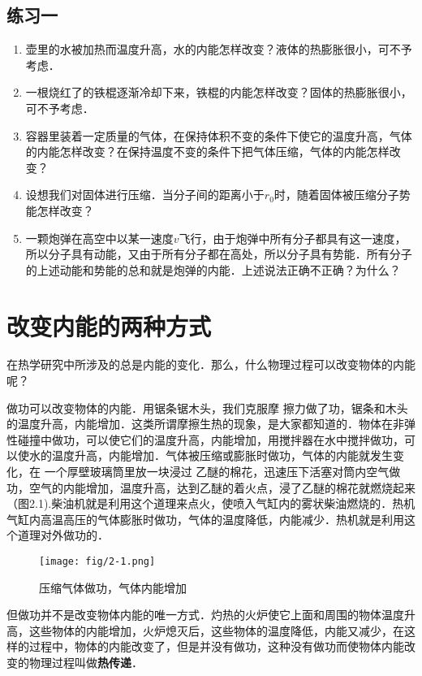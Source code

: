 \subsection*{练习一}
\begin{enumerate}
	\item 壶里的水被加热而温度升高，水的内能怎样改变？液体的热膨胀很小，可不予考虑．
\item 一根烧红了的铁棍逐渐冷却下来，铁棍的内能怎样改变？固体的热膨胀很小，可不予考虑．
\item 容器里装着一定质量的气体，在保持体积不变的条件下使它的温度升高，气体的内能怎样改变？在保持温度不变的条件下把气体压缩，气体的内能怎样改变？
\item 设想我们对固体进行压缩．当分子间的距离小于$r_0$时，随着固体被压缩分子势能怎样改变？
\item 一颗炮弹在高空中以某一速度$v$飞行，由于炮弹中所有分子都具有这一速度，所以分子具有动能，又由于所有分子都在高处，所以分子具有势能．所有分子的上述动能和势能的总和就是炮弹的内能．上述说法正确不正确？为什么？
\end{enumerate}

\section{改变内能的两种方式}
在热学研究中所涉及的总是内能的变化．那么，什么物理过程可以改变物体的内能呢？

做功可以改变物体的内能．用锯条锯木头，我们克服摩
擦力做了功，锯条和木头的温度升高，内能增加．这类所谓摩擦生热的现象，是大家都知道的．物体在非弹性碰撞中做功，可以使它们的温度升高，内能增加，用搅拌器在水中搅拌做功，可以使水的温度升高，内能增加．气体被压缩或膨胀时做功，气体的内能就发生变化，在
一个厚壁玻璃筒里放一块浸过
乙醚的棉花，迅速压下活塞对筒内空气做功，空气的内能增加，温度升高，达到乙醚的着火点，浸了乙醚的棉花就燃烧起来（图2.1).柴油机就是利用这个道理来点火，使喷入气缸内的雾状柴油燃烧的．热机气缸内高温高压的气体膨胀时做功，气体的温度降低，内能减少．热机就是利用这个道理对外做功的．

\begin{figure}[htp]
\centering\texttt{[image: fig/2-1.png]}
\caption{压缩气体做功，气体内能增加
}
\end{figure}

但做功并不是改变物体内能的唯一方式．灼热的火炉使它上面和周围的物体温度升高，这些物体的内能增加，火炉熄灭后，这些物体的温度降低，内能又减少，在这样的过程中，物体的内能改变了，但是并没有做功，这种没有做功而使物体内能改变的物理过程叫做\textbf{热传递}．

